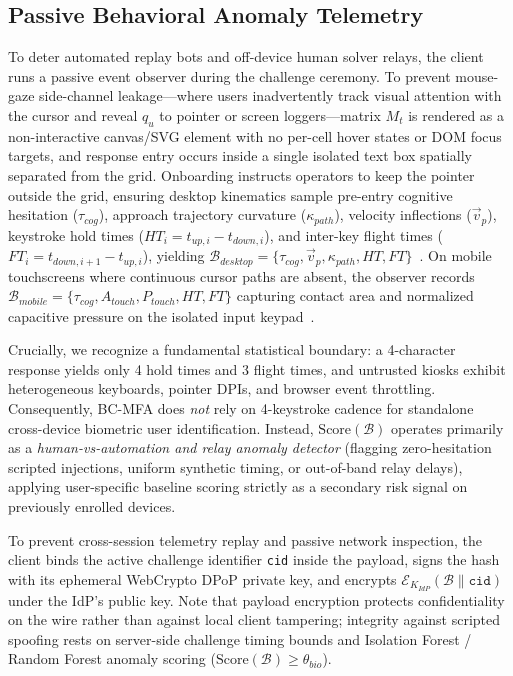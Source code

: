 \subsection{Passive Behavioral Anomaly Telemetry}
To deter automated replay bots and off-device human solver relays, the client runs a passive event observer during the challenge ceremony. To prevent mouse-gaze side-channel leakage—where users inadvertently track visual attention with the cursor and reveal $q_u$ to pointer or screen loggers—matrix $M_t$ is rendered as a non-interactive canvas/SVG element with no per-cell hover states or DOM focus targets, and response entry occurs inside a single isolated text box spatially separated from the grid. Onboarding instructs operators to keep the pointer outside the grid, ensuring desktop kinematics sample pre-entry cognitive hesitation ($\tau_{cog}$), approach trajectory curvature ($\kappa_{path}$), velocity inflections ($\vec{v}_p$), keystroke hold times ($HT_i = t_{up,i} - t_{down,i}$), and inter-key flight times ($FT_i = t_{down,i+1} - t_{up,i}$), yielding $\mathcal{B}_{desktop} = \{\tau_{cog}, \vec{v}_p, \kappa_{path}, HT, FT\}$~\cite{khan2024mouse}. On mobile touchscreens where continuous cursor paths are absent, the observer records $\mathcal{B}_{mobile} = \{\tau_{cog}, A_{touch}, P_{touch}, HT, FT\}$ capturing contact area and normalized capacitive pressure on the isolated input keypad~\cite{incel2021dakota}.

Crucially, we recognize a fundamental statistical boundary: a 4-character response yields only 4 hold times and 3 flight times, and untrusted kiosks exhibit heterogeneous keyboards, pointer DPIs, and browser event throttling. Consequently, BC-MFA does \emph{not} rely on 4-keystroke cadence for standalone cross-device biometric user identification. Instead, $\text{Score}(\mathcal{B})$ operates primarily as a \emph{human-vs-automation and relay anomaly detector} (flagging zero-hesitation scripted injections, uniform synthetic timing, or out-of-band relay delays), applying user-specific baseline scoring strictly as a secondary risk signal on previously enrolled devices.

To prevent cross-session telemetry replay and passive network inspection, the client binds the active challenge identifier \texttt{cid} inside the payload, signs the hash with its ephemeral WebCrypto DPoP private key, and encrypts $\mathcal{E}_{K_{IdP}}(\mathcal{B} \parallel \texttt{cid})$ under the IdP's public key. Note that payload encryption protects confidentiality on the wire rather than against local client tampering; integrity against scripted spoofing rests on server-side challenge timing bounds and Isolation Forest / Random Forest anomaly scoring ($\text{Score}(\mathcal{B}) \ge \theta_{bio}$).

